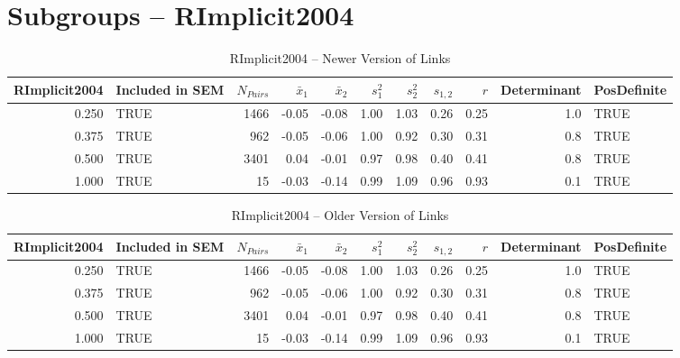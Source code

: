 \documentclass{article}\usepackage[]{graphicx}\usepackage[]{color}
\begin{document}
\section{Subgroups --  RImplicit2004 }%
\begin{table}[ht]
\centering
\begin{tabular}{rlrrrrrrrrl}
  \hline
RImplicit2004 & Included in SEM & $N_{Pairs}$ & $\bar{x}_1$ & $\bar{x}_2$ & $s_1^2$ & $s_2^2$ & $s_{1,2}$ & $r$ & Determinant & PosDefinite \\ 
  \hline
0.250 & TRUE & 1466 & -0.05 & -0.08 & 1.00 & 1.03 & 0.26 & 0.25 & 1.0 & TRUE \\ 
  0.375 & TRUE & 962 & -0.05 & -0.06 & 1.00 & 0.92 & 0.30 & 0.31 & 0.8 & TRUE \\ 
  0.500 & TRUE & 3401 & 0.04 & -0.01 & 0.97 & 0.98 & 0.40 & 0.41 & 0.8 & TRUE \\ 
  1.000 & TRUE & 15 & -0.03 & -0.14 & 0.99 & 1.09 & 0.96 & 0.93 & 0.1 & TRUE \\ 
   \hline
\end{tabular}
\caption{RImplicit2004 -- Newer Version of Links} 
\end{table}
\begin{table}[ht]
\centering
\begin{tabular}{rlrrrrrrrrl}
  \hline
RImplicit2004 & Included in SEM & $N_{Pairs}$ & $\bar{x}_1$ & $\bar{x}_2$ & $s_1^2$ & $s_2^2$ & $s_{1,2}$ & $r$ & Determinant & PosDefinite \\ 
  \hline
0.250 & TRUE & 1466 & -0.05 & -0.08 & 1.00 & 1.03 & 0.26 & 0.25 & 1.0 & TRUE \\ 
  0.375 & TRUE & 962 & -0.05 & -0.06 & 1.00 & 0.92 & 0.30 & 0.31 & 0.8 & TRUE \\ 
  0.500 & TRUE & 3401 & 0.04 & -0.01 & 0.97 & 0.98 & 0.40 & 0.41 & 0.8 & TRUE \\ 
  1.000 & TRUE & 15 & -0.03 & -0.14 & 0.99 & 1.09 & 0.96 & 0.93 & 0.1 & TRUE \\ 
   \hline
\end{tabular}
\caption{RImplicit2004 -- Older Version of Links} 
\end{table}


\end{document}
